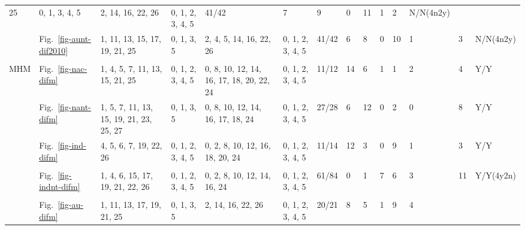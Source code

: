 \begin{table*}
{\begin{tabular}{l|l|l|l|l|l|l|l|l|l|l|l|l|l}
{{  25}} & \multirow{2}{*}{\parbox{1cm}{0, 1, 3, 4, 5}} &
  \multirow{2}{*}{\parbox{2cm}{2, 14, 16, 22, 26}} &
  \multirow{2}{*}{\parbox{1cm}{0, 1, 2, 3, 4, 5}} & 41/42 & 7 & 9 & 0 & 11 & 1
  & 2 & N/N(4n2y) \\ \\ \cline{2-14}
& Fig.~\ref{fig-aunt-dif2010} & \multirow{2}{*}{\parbox{2cm}{1, 11, 13, 15, 17,
  19, 21, 25}} & \multirow{2}{*}{\parbox{1cm}{0, 1, 3, 5}} &
  \multirow{2}{*}{\parbox{2cm}{2, 4, 5, 14, 16, 22, 26}} &
  \multirow{2}{*}{\parbox{1cm}{0, 1, 2, 3, 4, 5}} & 41/42 & 6 & 8 & 0 & 10 & 1
  & 3 & N/N(4n2y) \\ \\ \hline
\multirow{12}{*}{MHM}
& Fig.~\ref{fig-nac-difm} & \multirow{2}{*}{\parbox{2cm}{1, 4, 5, 7, 11, 13, 15,
  21, 25}} & \multirow{2}{*}{\parbox{1cm}{0, 1, 2, 3, 4, 5}} &
  \multirow{2}{*}{\parbox{2.2cm}{0, 8, 10, 12, 14, 16, 17, 18, 20, 22, 24}} &
  \multirow{2}{*}{\parbox{1cm}{0, 1, 2, 3, 4, 5}} & 11/12 & 14 & 6 & 1 & 1 & 2
  & 4 & Y/Y \\ \\ \cline{2-14}
& Fig.~\ref{fig-nant-difm} & \multirow{2}{*}{\parbox{2cm}{1, 5, 7, 11, 13, 15,
  19, 21, 23, 25, 27}} &
  \multirow{2}{*}{\parbox{1cm}{0, 1, 3, 5}} &
  \multirow{2}{*}{\parbox{2.4cm}{0, 8, 10, 12, 14, 16, 17, 18, 24}} &
  \multirow{2}{*}{\parbox{1cm}{0, 1, 2, 3, 4, 5}} & 27/28 & 6 & 12 & 0 & 2 & 0
  & 8 & Y/Y \\ \\ \cline{2-14}
& Fig.~\ref{fig-ind-difm} & \multirow{2}{*}{\parbox{2cm}{4, 5, 6, 7, 19, 22, 26}} &
  \multirow{2}{*}{\parbox{1cm}{0, 1, 2, 3, 4, 5}} &
  \multirow{2}{*}{\parbox{2.4cm}{0, 2, 8, 10, 12, 16, 18, 20, 24}} &
  \multirow{2}{*}{\parbox{1cm}{0, 1, 2, 3, 4, 5}} & 11/14 & 12 & 3 & 0 & 9 & 1
  & 3 & Y/Y \\ \\ \cline{2-14}
& Fig.~\ref{fig-indnt-difm} & \multirow{2}{*}{\parbox{2cm}{1, 4, 6, 15, 17, 19, 21,
  22, 26}} & \multirow{2}{*}{\parbox{1cm}{0, 1, 2, 3, 4, 5}} &
  \multirow{2}{*}{\parbox{2.4cm}{0, 2, 8, 10, 12, 14, 16, 24}} &
  \multirow{2}{*}{\parbox{1cm}{0, 1, 2, 3, 4, 5}} & 61/84 & 0 & 1 & 7 & 6 & 3 &
  11 & Y/Y(4y2n) \\ \\ \cline{2-14}
& Fig.~\ref{fig-au-difm} & \multirow{2}{*}{\parbox{2cm}{1, 11, 13, 17, 19, 21, 25}} &
  \multirow{2}{*}{\parbox{1cm}{0, 1, 3, 5}} &
  \multirow{2}{*}{\parbox{2.4cm}{2, 14, 16, 22, 26}} &
  \multirow{2}{*}{\parbox{1cm}{0, 1, 2, 3, 4, 5}} & 20/21 & 8 & 5 & 1 & 9 & 4

\end{tabular}}
\end{table*}
